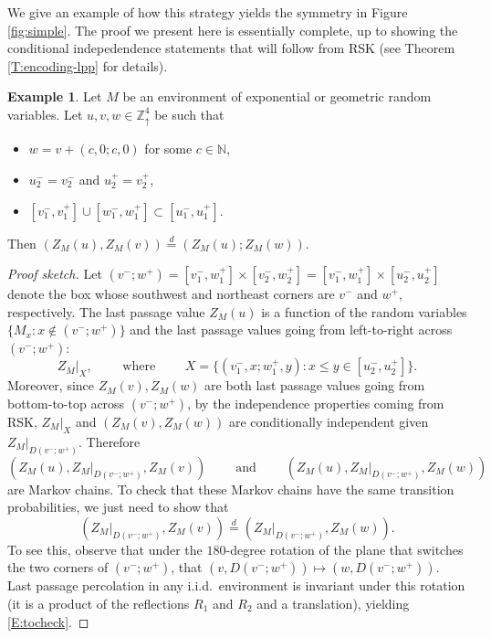 \documentclass[aop, preprint]{imsart}
\theoremstyle{plain}
\theoremstyle{definition}
\newtheorem{example}[theorem]{Example} %
\theoremstyle{plain}
\newcommand{\N}{\mathbb{N}}
\newcommand{\sset}{\subset}
\newcommand{\mathand}{\;\text{and}\;}
\newcommand{\Zd}{\mathds{Z}^4_\uparrow}
\newcommand{\eqd}{\stackrel{d}{=}}
\newcommand{\X}{\times}
\begin{document}
We give an example of how this strategy yields the symmetry in Figure \ref{fig:simple}. The proof we present here is essentially complete, up to showing the conditional indepedendence statements that will follow from RSK (see Theorem \ref{T:encoding-lpp} for details).

\begin{example}
	\label{Ex:simple}
	Let $M$ be an environment of exponential or geometric random variables. Let $u, v, w \in \Zd$ be such that 
	\begin{itemize}[nosep]
		\item $w = v + (c, 0; c, 0)$ for some $c \in \N$,
		\item $u^-_2 = v^-_2$ and $u^+_2 = v^+_2$,
		\item  $[v_1^-, v_1^+] \cup [w_1^-, w_1^+] \sset [u^-_1, u^+_1]$.
	\end{itemize}
	Then $(Z_M(u), Z_M(v)) \eqd (Z_M(u); Z_M(w))$.
\end{example} 

\begin{proof}[Proof sketch]
	Let $(v^-; w^+) = [v^-_1, w^+_1] \X [v^-_2, w^+_2] = [v^-_1, w^+_1] \X [u^-_2, u^+_2]$ denote the box whose southwest and northeast corners are $v^-$ and $w^+$, respectively.
	The last passage value $Z_M(u)$ is a function of the random variables $\{M_x : x \notin (v^-; w^+)\}$ and the last passage values going from left-to-right across $(v^-; w^+)$:
	$$
	Z_M|_X, \qquad \text{ where } \qquad X = \{(v_1^-, x; w^+_1, y) : x \le y \in [u^-_2, u^+_2] \}.
	$$ 
	Moreover, since $Z_M(v), Z_M(w)$ are both last passage values going from bottom-to-top across $(v^-; w^+)$, by the independence properties coming from RSK, $Z_M|_X$ and $(Z_M(v), Z_M(w))$ are conditionally independent given $Z_M|_{D(v^-; w^+)}$. Therefore
	$$(Z_M(u), Z_M|_{D(v^-; w^+)}, Z_M(v)) \qquad \mathand \qquad (Z_M(u), Z_M|_{D(v^-; w^+)}, Z_M(w))
	$$
	are Markov chains.
	To check that these Markov chains have the same transition probabilities, we just need to show that
	\begin{equation}
	\label{E:tocheck}
	(Z_M|_{D(v^-; w^+)}, Z_M(v)) \eqd (Z_M|_{D(v^-; w^+)}, Z_M(w)).
	\end{equation}
	To see this, observe that under the $180$-degree rotation of the plane that switches the two corners of $(v^-; w^+)$, that $(v, D(v^-; w^+)) \mapsto (w, D(v^-; w^+))$. Last passage percolation in any i.i.d.\ environment is invariant under this rotation (it is a product of the reflections $R_1$ and $R_2$ and a translation), yielding \eqref{E:tocheck}.
\end{proof}
\end{document}
